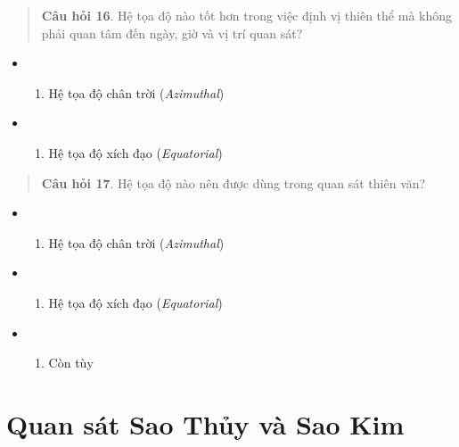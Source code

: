 \documentclass[
  a4paper,
]{book}
\providecommand{\tightlist}{%
  \setlength{\itemsep}{0pt}\setlength{\parskip}{0pt}}
\begin{document}
\begin{quote}
\textbf{Câu hỏi 16}. Hệ tọa độ nào tốt hơn trong việc định vị thiên thể mà không phải quan tâm đến ngày, giờ và vị trí quan sát?
\end{quote}

\begin{itemize}
\tightlist
\item
  \begin{enumerate}
  \def\labelenumi{(\Alph{enumi})}
  \tightlist
  \item
    Hệ tọa độ chân trời (\emph{Azimuthal})\\
  \end{enumerate}
\item
  \begin{enumerate}
  \def\labelenumi{(\Alph{enumi})}
  \setcounter{enumi}{1}
  \tightlist
  \item
    Hệ tọa độ xích đạo (\emph{Equatorial})
  \end{enumerate}
\end{itemize}

\begin{quote}
\textbf{Câu hỏi 17}. Hệ tọa độ nào nên được dùng trong quan sát thiên văn?
\end{quote}

\begin{itemize}
\tightlist
\item
  \begin{enumerate}
  \def\labelenumi{(\Alph{enumi})}
  \tightlist
  \item
    Hệ tọa độ chân trời (\emph{Azimuthal})\\
  \end{enumerate}
\item
  \begin{enumerate}
  \def\labelenumi{(\Alph{enumi})}
  \setcounter{enumi}{1}
  \tightlist
  \item
    Hệ tọa độ xích đạo (\emph{Equatorial})\\
  \end{enumerate}
\item
  \begin{enumerate}
  \def\labelenumi{(\Alph{enumi})}
  \setcounter{enumi}{2}
  \tightlist
  \item
    Còn tùy
  \end{enumerate}
\end{itemize}

\chapter{Quan sát Sao Thủy và Sao Kim}\label{quan-suxe1t-sao-thux1ee7y-vuxe0-sao-kim}
\end{document}
